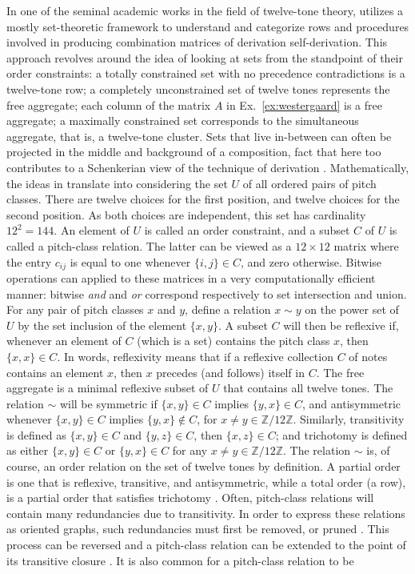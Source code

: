 In one of the seminal academic works in the field of twelve-tone theory, \cite{Starr1984} utilizes a mostly set-theoretic framework to understand and categorize rows and procedures involved in producing combination matrices of derivation self-derivation. This approach revolves around the idea of looking at sets from the standpoint of their order constraints: a totally constrained set with no precedence contradictions is a twelve-tone row; a completely unconstrained set of twelve tones represents the free aggregate; each column of the matrix $A$ in Ex.~\ref{ex:westergaard} is a free aggregate; a maximally constrained set corresponds to the simultaneous aggregate, that is, a twelve-tone cluster. Sets that live in-between can often be projected in the middle and background of a composition, fact that here too contributes to a Schenkerian view of the technique of derivation \cite[183, 184]{Starr1984}. Mathematically, the ideas in \cite{Starr1984} translate into considering the set $U$ of all ordered pairs of pitch classes. There are twelve choices for the first position, and twelve choices for the second position. As both choices are independent, this set has cardinality $12^2 = 144$. An element of $U$ is called an order constraint, and a subset $C$ of $U$ is called a pitch-class relation. The latter can be viewed as a $12 \times 12$ matrix where the entry $c_{ij}$ is equal to one whenever $\{ i, j \} \in C$, and zero otherwise. Bitwise operations can applied to these matrices in a very computationally efficient manner: bitwise \emph{and} and \emph{or} correspond respectively to set intersection and union. For any pair of pitch classes $x$ and $y$, define a relation $x \sim y$ on the power set of $U$ by the set inclusion of the element $\{ x, y \}$. A subset $C$ will then be reflexive if, whenever an element of $C$ (which is a set) contains the pitch class $x$, then $\{ x, x \} \in C$. In words, reflexivity means that if a reflexive collection $C$ of notes contains an element $x$, then $x$ precedes (and follows) itself in $C$. The free aggregate is a minimal reflexive subset of $U$ that contains all twelve tones. The relation $\sim$ will be symmetric if $\{ x, y \} \in C$ implies $\{ y, x \} \in C$, and antisymmetric whenever $\{ x, y \} \in C$ implies $\{ y, x \} \notin C$, for $x \ne y \in \mathbb{Z}/ 12 \mathbb{Z}$. Similarly, transitivity is defined as $\{ x, y \} \in C$ and $\{ y, z \} \in C$, then $\{ x, z\} \in C$; and trichotomy is defined as either $\{ x, y \} \in C$ or $\{ y, x \} \in C$ for any $x \ne y \in \mathbb{Z}/ 12 \mathbb{Z}$. The relation $\sim$ is, of course, an order relation on the set of twelve tones by definition. A partial order is one that is reflexive, transitive, and antisymmetric, while a total order (a row), is a partial order that satisfies trichotomy \cite[184, 185]{Starr1984}. Often, pitch-class relations will contain many redundancies due to transitivity. In order to express these relations as oriented graphs, such redundancies must first be removed, or pruned \cite[186]{Starr1984}. This process can be reversed and a pitch-class relation can be extended to the point of its transitive closure \cite[190]{Starr1984}. It is also common for a pitch-class relation to be 